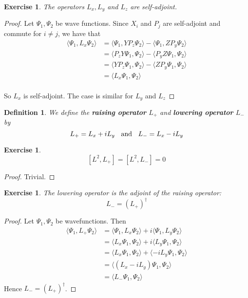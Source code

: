 \documentclass[12pt]{amsart}
\newtheorem{defn}[thm]{Definition}
\newtheorem{ex}[thm]{Exercise}
\renewcommand{\r}{\rangle}
\renewcommand{\l}{\langle}
\begin{document}
\begin{ex} The operators $L_x,L_y$ and $L_z$ are self-adjoint.
\end{ex}

\begin{proof} Let $\Psi_1, \Psi_2$ be wave functions. Since $X_i$ and $P_j$ are self-adjoint and commute for $i \neq j$, we have that
\begin{align*}
\l \Psi_1 , L_x \Psi_2\r
&= \l \Psi_1 , YP_z \Psi_2\r - \l \Psi_1 , ZP_y \Psi_2\r\\
&= \l P_zY\Psi_1 ,  \Psi_2\r - \l P_yZ \Psi_1 , \Psi_2\r \\
&= \l YP_z \Psi_1 ,  \Psi_2\r - \l ZP_y \Psi_1 , \Psi_2\r \\
&= \l L_x\Psi_1 , \Psi_2\r 
\end{align*} \\
So $L_x$ is self-adjoint. The case is similar for $L_y$ and $L_z$
\end{proof}

\begin{defn}
We define the \textbf{raising operator} $L_+$ and \textbf{lowering operator} $L_-$ by $$L_+ = L_x +iL_y \hspace{2mm}\text{ and } \hspace{2mm} L_- = L_x - iL_y$$
\end{defn}

\begin{ex}
$$[L^2, L_+] = [L^2,L_-] = 0$$
\end{ex}

\begin{proof}
Trivial.
\end{proof}

\begin{ex}
The lowering operator is the adjoint of the raising operator: $$L_- = (L_+)^{\dagger}$$
\end{ex}

\begin{proof} Let $\Psi_1, \Psi_2$ be wavefunctions. Then 
\begin{align*}
\l \Psi_1 , L_+ \Psi_2 \r
&=  \l \Psi_1 , L_x \Psi_2 \r + i\l \Psi_1 , L_y \Psi_2 \r \\
&= \l L_x \Psi_1 , \Psi_2 \r + i\l L_y \Psi_1 ,  \Psi_2 \r \\
&= \l L_x \Psi_1 , \Psi_2 \r + \l -i L_y \Psi_1 ,  \Psi_2 \r \\
&= \l (L_x -iL_y)\Psi_1 , \Psi_2 \r\\
&= \l L_- \Psi_1 , \Psi_2 \r
\end{align*}
Hence $L_- = (L_+)^{\dagger}$.
\end{proof}
\end{document}
